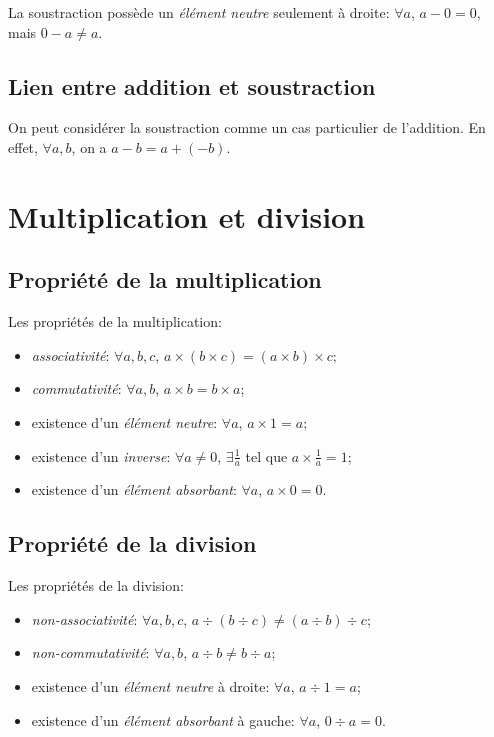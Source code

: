 \noindent La soustraction possède un \emph{élément neutre} seulement à droite: $\forall a$, $a-0 = 0$, mais $0-a\not= a$.


\subsection{Lien entre addition et soustraction}

On peut considérer la soustraction comme un cas particulier de l'addition. En effet, $\forall a,b$, on a $a-b = a+(-b)$.


\section{Multiplication et division}

\subsection{Propriété de la multiplication}

Les propriétés de la multiplication:
\begin{itemize}
    \item \emph{associativité}: $\forall a,b,c$, $a\times (b\times c) = (a\times b) \times c$;
    \item \emph{commutativité}: $\forall a,b$, $a\times b = b \times a$;
    \item existence d'un \emph{élément neutre}: $\forall a$, $a\times 1 = a$;
    \item existence d'un \emph{inverse}: $\forall a \not= 0$, $\exists \frac1a$ tel que $a \times \frac1a = 1$;
    \item existence d'un \emph{élément absorbant}: $\forall a$, $a\times 0 = 0$.
\end{itemize}

\subsection{Propriété de la division}

Les propriétés de la division:
\begin{itemize}
    \item \emph{non-associativité}: $\forall a,b,c$, $a \div (b\div c) \not = (a\div b)\div c$;
    \item \emph{non-commutativité}: $\forall a,b$, $a \div b \not= b \div a$;
    \item existence d'un \emph{élément neutre} à droite: $\forall a$, $a \div 1 = a$;
    \item existence d'un \emph{élément absorbant} à gauche: $\forall a$, $0\div a = 0$.
\end{itemize}

